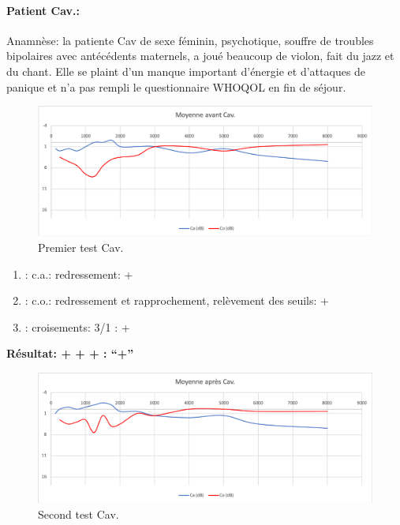 \paragraph{ Patient Cav.: }
Anamnèse: la patiente Cav de sexe féminin, psychotique, souffre de troubles bipolaires avec 
antécédents maternels, a joué beaucoup de violon, fait du  jazz et du 
chant. Elle se plaint d'un manque important d'énergie et d'attaques de panique et n'a pas rempli le 
questionnaire WHOQOL en fin de séjour.
\begin{figure}[th]
\centering
\includegraphics[width=0.7\linewidth]{images/graphiques/cav_pre.png}
\caption[Patient Cav. : 1° test]{Premier test Cav.}

\end{figure}

	\begin{enumerate}

 		\item : c.a.: redressement: +

 		\item : c.o.: redressement et rapprochement, relèvement des seuils: +
 		\item : croisements: 3/1 :  +

                \end{enumerate}

                \textbf{ Résultat:  + + +       : ``+''}

                \begin{figure}%
\centering
\includegraphics[width=0.7\linewidth]{images/graphiques/cav_post.png}
\caption[Patient Cav. : 2° test]{Second test Cav.}

                \end{figure}
            
